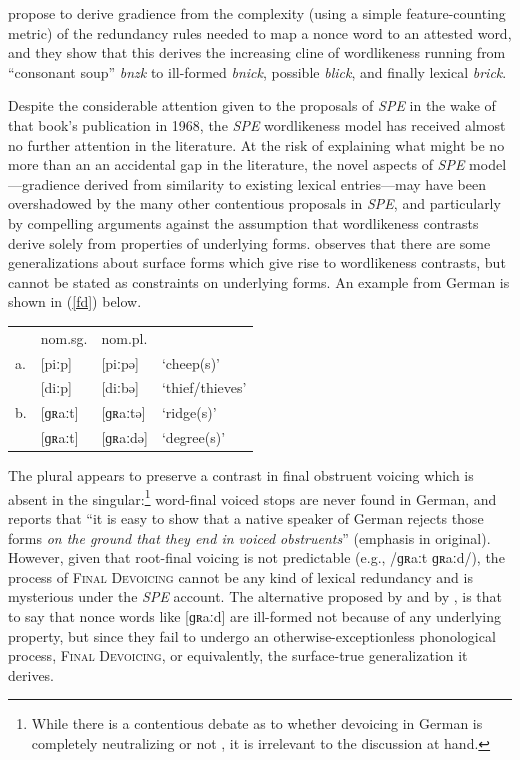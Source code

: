 \citeauthor{SPE} propose to derive gradience from the complexity (using a simple feature-counting metric) of the redundancy rules needed to map a nonce word to an attested word, and they show that this derives the increasing cline of wordlikeness running from ``consonant soup'' \emph{bnzk} to ill-formed \emph{bnick}, possible \emph{blick}, and finally lexical \emph{brick}.

Despite the considerable attention given to the proposals of \emph{SPE} in the wake of that book's publication in 1968, the \emph{SPE} wordlikeness model has received almost no further attention in the literature. At the risk of explaining what might be no more than an an accidental gap in the literature, the novel aspects of \emph{SPE} model---gradience derived from similarity to existing lexical entries---may have been overshadowed by the many other contentious proposals in \emph{SPE}, and particularly by compelling arguments against the assumption that wordlikeness contrasts derive solely from properties of underlying forms. \citet{Shibatani1973} observes that there are some generalizations about surface forms which give rise to wordlikeness contrasts, but cannot be stated as constraints on underlying forms. An example from German is shown in (\ref{fd}) below.

\begin{example} 
\label{fd}
\begin{tabular}{l l l l}
   & nom.sg. & nom.pl.    \\
a. & [piːp]    & [piːpə]  & `cheep(s)'      \\
   & [diːp]    & [diːbə]  & `thief/thieves' \\
b. & [ɡʀaːt]   & [ɡʀaːtə] & `ridge(s)'      \\
   & [ɡʀaːt]   & [ɡʀaːdə] & `degree(s)'     \\
\end{tabular}
\end{example}

\noindent The plural appears to preserve a contrast in final obstruent voicing which is absent in the singular:\footnote{While there is a contentious debate as to whether devoicing in German is completely neutralizing \citep[e.g.,][]{Fourakis1984} or not \citep[e.g.,][]{Port1985}, it is irrelevant to the discussion at hand.} word-final voiced stops are never found in German, and \citet[95]{Shibatani1973} reports that ``it is easy to show that a native speaker of German rejects those forms \emph{on the ground that they end in voiced obstruents}'' (emphasis in original). However, given that root-final voicing is not predictable (e.g., /ɡʀaːt \alt{} ɡʀaːd/), the process of \textsc{Final Devoicing} cannot be any kind of lexical redundancy and is mysterious under the \emph{SPE} account. The alternative proposed by \citeauthor{Shibatani1973} and by \citet{Clayton1976}, is that to say that nonce words like [ɡʀaːd] are ill-formed not because of any underlying property, but since they fail to undergo an otherwise-exceptionless phonological process, \textsc{Final Devoicing}, or equivalently, the surface-true generalization it derives.

